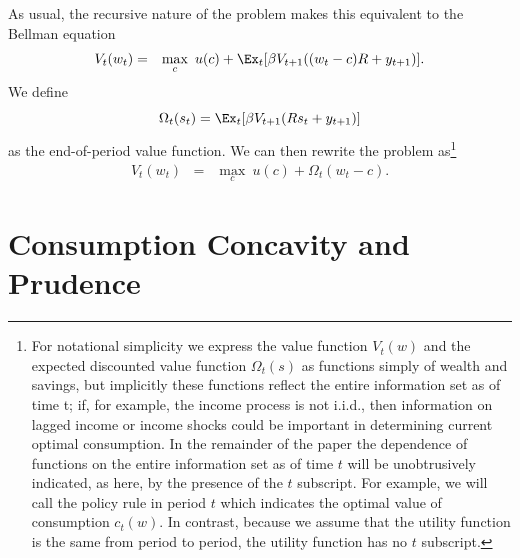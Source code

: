 \documentclass[titlepage]{\econtex}
\begin{document}
  As usual, the recursive nature of the problem makes this equivalent to the Bellman equation
  \begin{eqnarray*}  \label{eq:recursiveV}
    V_{t}(w_{t}) & = & \max_{c} ~ u(c) + \Ex_{t} [{\beta}
                       V_{t+1}(%
                       (w_t - c){R} + {y}_{t+1})].
  \end{eqnarray*}
  We define
  \begin{equation*} \label{eq:OmegaEV}
    \Omega_t(s_t) = \Ex_t [ \beta V_{t+1}(R s_t + y_{t+1})]
  \end{equation*}
  as the end-of-period value function. We can then rewrite the problem as\footnote{For notational simplicity we express the value function $V_t(w)$ and the expected discounted value function $\Omega_{t}(s)$ as functions simply of wealth and savings, but implicitly these functions reflect the entire information set as of time t; if, for example, the income process is not i.i.d., then information on lagged income or income shocks could be important in determining current optimal consumption.  In the remainder of the paper the dependence of functions on the entire information set as of time $t$ will be unobtrusively indicated, as here, by the presence of the $t$ subscript. For example, we will call the policy rule in period $t$ which indicates the optimal value of consumption $c_{t}(w)$. In contrast, because we assume that the utility function is the same from period to period, the utility function has no $t$ subscript.}
  \begin{eqnarray*}  \label{eq:subphi}
    V_{t}(w_{t}) & = & \max_{c} ~ u(c) + \Omega_{t}(w_t - c).
  \end{eqnarray*}



\section{Consumption Concavity and Prudence}\label{sec:PrudAndCC}
\end{document}
